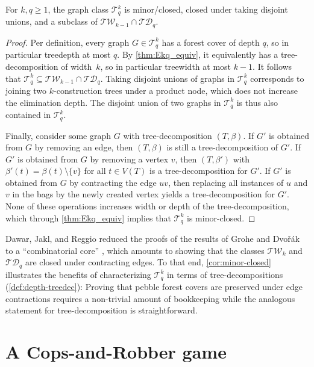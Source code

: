 \documentclass{lmcs}
\theoremstyle{plain}\newtheorem{claim}[thm]{Claim}   %
\newcommand{\cT}{\ensuremath{\mathcal T}}
\newcommand{\TW}{\ensuremath{\mathcal{TW}}}
\newcommand{\TD}{\ensuremath{\mathcal{TD}}}
\newcommand{\Ekq}{\ensuremath{\cT_{q}^{k}}}
\begin{document}
\begin{cor}
	\label{cor:Ekq-subset-tw-td}
	\label{cor:minor-closed}
	For $k, q\geq 1$, the graph class
	$\Ekq $ is minor\-/closed, closed under taking disjoint unions, and a subclass of $\TW_{k-1}\cap\TD_q$.
\end{cor}
\begin{proof}
	Per definition, every graph $G \in \Ekq$ has a forest cover of depth $q$, so in particular treedepth at most $q$. By \autoref{thm:Ekq_equiv}, it equivalently has a tree-decomposition of width~$k$, so in particular treewidth at most $k-1$. It follows that $\Ekq \subseteq \TW_{k-1} \cap \TD_q$. Taking disjoint unions of graphs in $\Ekq$ corresponds to joining two $k$-construction trees under a product node, which does not increase the elimination depth. The disjoint union of two graphs in $\Ekq$ is thus also contained in $\Ekq$. 
	
	Finally, consider some graph $G$ with tree-decomposition $(T, \beta)$. If $G'$ is obtained from $G$ by removing an edge, then $(T, \beta)$ is still a tree-decomposition of $G'$. If $G'$ is obtained from $G$ by removing a vertex $v$, then $(T, \beta')$ with $\beta'(t) = \beta(t) \setminus \{v\}$ for all $t\in V(T)$ is a tree-decomposition for $G'$. If $G'$ is obtained from $G$ by contracting the edge $uv$, then replacing all instances of $u$ and $v$ in the bags by the newly created vertex yields a tree-decomposition for $G'$. None of these operations increases width or depth of the tree-decomposition, which through \autoref{thm:Ekq_equiv} implies that $\Ekq$ is minor-closed.
\end{proof}

Dawar, Jakl, and Reggio reduced the proofs of the results of Grohe and Dvo\v{r}\'ak \cite{Dvorak_recognizing_2010,Grohe_counting_2020} to a \enquote{combinatorial core} \cite[Remark~17]{dawar_lovasz-type_2021}, which amounts to showing that the classes $\TW_k$ and $\TD_q$ are closed under contracting edges.
To that end, \autoref{cor:minor-closed} illustrates the benefits of characterizing $\Ekq$ in terms of tree-decompositions (\autoref{def:depth-treedec}): Proving that pebble forest covers are preserved under edge contractions requires a non-trivial amount of bookkeeping while the analogous statement for tree-decomposition is straightforward.


\section{A Cops-and-Robber game}
\label{sec:deep-wide-game}
\end{document}
